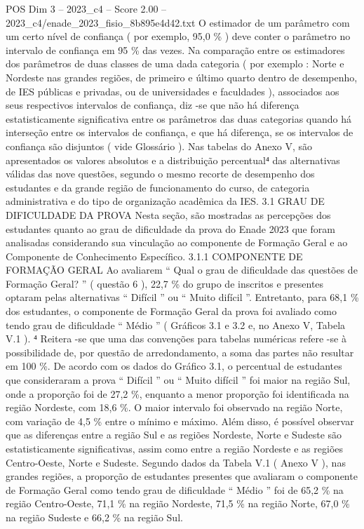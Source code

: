 \begin{textsample}{POS Dim 3 – 2023\_c4 – Score 2.00 – 2023\_c4/enade\_2023\_fisio\_8b895e4d42.txt}
O estimador de um parâmetro com um certo nível de confiança ( por exemplo, 95,0 \% ) deve conter o parâmetro no intervalo de confiança em 95 \% das vezes.
Na comparação entre os estimadores dos parâmetros de duas classes de uma dada categoria ( por exemplo : Norte e Nordeste nas grandes regiões, de primeiro e último quarto dentro de desempenho, de IES públicas e privadas, ou de universidades e faculdades ), associados aos seus respectivos intervalos de confiança, diz -se que não há diferença estatisticamente significativa entre os parâmetros das duas categorias quando há interseção entre os intervalos de confiança, e que há diferença, se os intervalos de confiança são disjuntos ( vide Glossário ).
Nas tabelas do Anexo V, são apresentados os valores absolutos e a distribuição percentual⁴ das alternativas válidas das nove questões, segundo o mesmo recorte de desempenho dos estudantes e da grande região de funcionamento do curso, de categoria administrativa e do tipo de organização acadêmica da IES. 3.1 GRAU DE DIFICULDADE DA PROVA Nesta seção, são mostradas as percepções dos estudantes quanto ao grau de dificuldade da prova do Enade 2023 que foram analisadas considerando sua vinculação ao componente de Formação Geral e ao Componente de Conhecimento Específico. 3.1.1 COMPONENTE DE FORMAÇÃO GERAL Ao avaliarem “ Qual o grau de dificuldade das questões de Formação Geral? ” ( questão 6 ), 22,7 \% do grupo de inscritos e presentes optaram pelas alternativas “ Difícil ” ou “ Muito difícil ”.
Entretanto, para 68,1 \% dos estudantes, o componente de Formação Geral da prova foi avaliado como tendo grau de dificuldade “ Médio ” ( Gráficos 3.1 e 3.2 e, no Anexo V, Tabela V.1 ). ⁴ Reitera -se que uma das convenções para tabelas numéricas refere -se à possibilidade de, por questão de arredondamento, a soma das partes não resultar em 100 \%.
De acordo com os dados do Gráfico 3.1, o percentual de estudantes que consideraram a prova “ Difícil ” ou “ Muito difícil ” foi maior na região Sul, onde a proporção foi de 27,2 \%, enquanto a menor proporção foi identificada na região Nordeste, com 18,6 \%.
O maior intervalo foi observado na região Norte, com variação de 4,5 \% entre o mínimo e máximo.
Além disso, é possível observar que as diferenças entre a região Sul e as regiões Nordeste, Norte e Sudeste são estatisticamente significativas, assim como entre a região Nordeste e as regiões Centro-Oeste, Norte e Sudeste.
Segundo dados da Tabela V.1 ( Anexo V ), nas grandes regiões, a proporção de estudantes presentes que avaliaram o componente de Formação Geral como tendo grau de dificuldade “ Médio ” foi de 65,2 \% na região Centro-Oeste, 71,1 \% na região Nordeste, 71,5 \% na região Norte, 67,0 \% na região Sudeste e 66,2 \% na região Sul.

\end{textsample}
